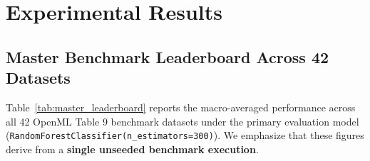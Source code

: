 \documentclass[sn-basic]{sn-jnl}
\begin{document}
\section{Experimental Results}
\label{sec:results}

\subsection{Master Benchmark Leaderboard Across 42 Datasets}
\label{subsec:master_leaderboard}

Table~\ref{tab:master_leaderboard} reports the macro-averaged performance across all 42 OpenML Table 9 benchmark datasets under the primary evaluation model (\texttt{RandomForestClassifier(n\_estimators=300)}). We emphasize that these figures derive from a \textbf{single unseeded benchmark execution}.
\end{document}
